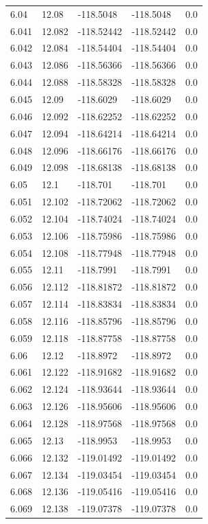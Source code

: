 \begin{tabular}{lllll}
6.04 & 12.08 & -118.5048 & -118.5048 & 0.0 \\
6.041 & 12.082 & -118.52442 & -118.52442 & 0.0 \\
6.042 & 12.084 & -118.54404 & -118.54404 & 0.0 \\
6.043 & 12.086 & -118.56366 & -118.56366 & 0.0 \\
6.044 & 12.088 & -118.58328 & -118.58328 & 0.0 \\
6.045 & 12.09 & -118.6029 & -118.6029 & 0.0 \\
6.046 & 12.092 & -118.62252 & -118.62252 & 0.0 \\
6.047 & 12.094 & -118.64214 & -118.64214 & 0.0 \\
6.048 & 12.096 & -118.66176 & -118.66176 & 0.0 \\
6.049 & 12.098 & -118.68138 & -118.68138 & 0.0 \\
6.05 & 12.1 & -118.701 & -118.701 & 0.0 \\
6.051 & 12.102 & -118.72062 & -118.72062 & 0.0 \\
6.052 & 12.104 & -118.74024 & -118.74024 & 0.0 \\
6.053 & 12.106 & -118.75986 & -118.75986 & 0.0 \\
6.054 & 12.108 & -118.77948 & -118.77948 & 0.0 \\
6.055 & 12.11 & -118.7991 & -118.7991 & 0.0 \\
6.056 & 12.112 & -118.81872 & -118.81872 & 0.0 \\
6.057 & 12.114 & -118.83834 & -118.83834 & 0.0 \\
6.058 & 12.116 & -118.85796 & -118.85796 & 0.0 \\
6.059 & 12.118 & -118.87758 & -118.87758 & 0.0 \\
6.06 & 12.12 & -118.8972 & -118.8972 & 0.0 \\
6.061 & 12.122 & -118.91682 & -118.91682 & 0.0 \\
6.062 & 12.124 & -118.93644 & -118.93644 & 0.0 \\
6.063 & 12.126 & -118.95606 & -118.95606 & 0.0 \\
6.064 & 12.128 & -118.97568 & -118.97568 & 0.0 \\
6.065 & 12.13 & -118.9953 & -118.9953 & 0.0 \\
6.066 & 12.132 & -119.01492 & -119.01492 & 0.0 \\
6.067 & 12.134 & -119.03454 & -119.03454 & 0.0 \\
6.068 & 12.136 & -119.05416 & -119.05416 & 0.0 \\
6.069 & 12.138 & -119.07378 & -119.07378 & 0.0 \\

\end{tabular}
